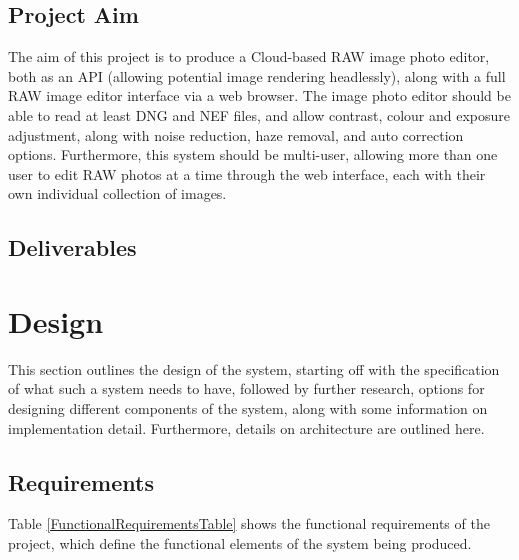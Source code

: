 \documentclass[12pt,a4paper]{article}
\begin{document}




\subsection{Project Aim}
The aim of this project is to produce a Cloud-based RAW image photo editor, both as an API (allowing potential
image rendering headlessly), along with a full RAW image editor interface via a web browser. The image photo editor
should be able to read at least DNG and NEF files, and allow contrast, colour and exposure adjustment, along with
noise reduction, haze removal, and auto correction options. Furthermore, this system should be multi-user, allowing more than
one user to edit RAW photos at a time through the web interface, each with their own individual collection of images.

\subsection{Deliverables}


\section{Design}

This section outlines the design of the system, starting off with the specification of what such a system
needs to have, followed by further research, options for designing different components of the system,
along with some information on implementation detail. Furthermore, details on architecture are outlined here.

\subsection{Requirements}
Table \ref{FunctionalRequirementsTable} shows the functional requirements of the project,
which define the functional elements of the system being produced.
\end{document}
